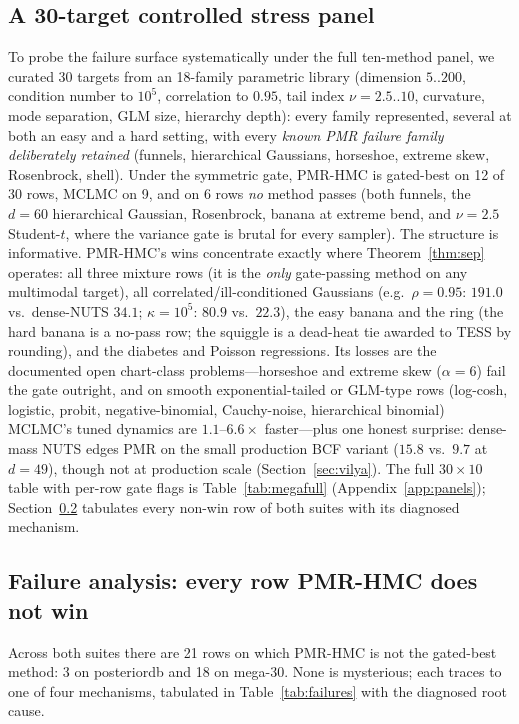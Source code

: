 \documentclass[11pt]{article}
\theoremstyle{remark}
\begin{document}
\subsection{A 30-target controlled stress panel}\label{sec:mega}
To probe the failure surface systematically under the full ten-method
panel, we curated 30 targets from an 18-family parametric library
(dimension $5..200$, condition number to $10^5$, correlation to $0.95$,
tail index $\nu=2.5..10$, curvature, mode separation, GLM size,
hierarchy depth): every family represented, several at both an easy
and a hard setting, with every \emph{known PMR failure family
deliberately retained} (funnels, hierarchical Gaussians, horseshoe,
extreme skew, Rosenbrock, shell).
Under the symmetric gate, PMR-HMC is gated-best on 12 of 30 rows,
MCLMC on 9, and on 6 rows \emph{no} method passes (both funnels, the
$d{=}60$ hierarchical Gaussian, Rosenbrock, banana at extreme bend,
and $\nu{=}2.5$ Student-$t$, where the variance gate is brutal for
every sampler). The structure is informative. PMR-HMC's wins
concentrate exactly where Theorem~\ref{thm:sep} operates: all three
mixture rows (it is the \emph{only} gate-passing method on any
multimodal target), all correlated/ill-conditioned Gaussians
(e.g.\ $\rho{=}0.95$: $191.0$ vs.\ dense-NUTS $34.1$; $\kappa{=}10^5$:
$80.9$ vs.\ $22.3$), the easy banana and the ring (the hard banana is
a no-pass row; the squiggle is a dead-heat tie awarded to TESS by
rounding), and the diabetes and Poisson regressions. Its losses are
the documented open chart-class problems---horseshoe and extreme skew
($\alpha{=}6$) fail the gate outright, and on smooth
exponential-tailed or GLM-type rows (log-cosh, logistic, probit,
negative-binomial, Cauchy-noise, hierarchical binomial) MCLMC's tuned
dynamics are $1.1$--$6.6\times$ faster---plus one honest surprise:
dense-mass NUTS edges PMR on the small production BCF variant ($15.8$
vs.\ $9.7$ at $d{=}49$), though not at production scale
(Section~\ref{sec:vilya}). The full $30\times10$ table with per-row
gate flags is Table~\ref{tab:megafull} (Appendix~\ref{app:panels});
Section~\ref{sec:failures} tabulates every non-win row of both suites
with its diagnosed mechanism.

\subsection{Failure analysis: every row PMR-HMC does not win}
\label{sec:failures}
Across both suites there are 21 rows on which PMR-HMC is not the
gated-best method: 3 on posteriordb and 18 on mega-30. None is
mysterious; each traces to one of four mechanisms, tabulated in
Table~\ref{tab:failures} with the diagnosed root cause.
\end{document}
